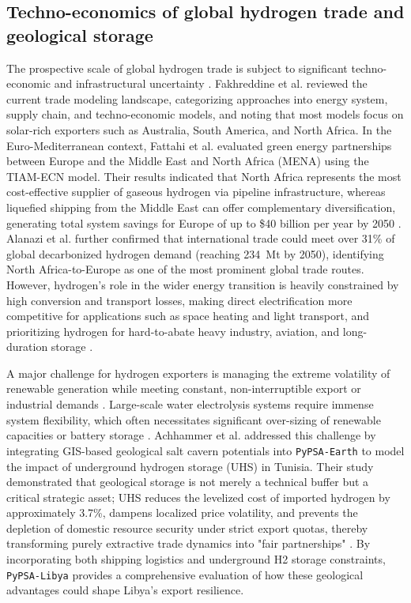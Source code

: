 \documentclass[preprint,12pt]{elsarticle}
\begin{document}
\subsection{Techno-economics of global hydrogen trade and geological storage}
The prospective scale of global hydrogen trade is subject to significant techno-economic and infrastructural uncertainty \cite{fakhreddine2025global}. Fakhreddine et al. \cite{fakhreddine2025global} reviewed the current trade modeling landscape, categorizing approaches into energy system, supply chain, and techno-economic models, and noting that most models focus on solar-rich exporters such as Australia, South America, and North Africa. In the Euro-Mediterranean context, Fattahi et al. \cite{fattahi2024opportunities} evaluated green energy partnerships between Europe and the Middle East and North Africa (MENA) using the TIAM-ECN model. Their results indicated that North Africa represents the most cost-effective supplier of gaseous hydrogen via pipeline infrastructure, whereas liquefied shipping from the Middle East can offer complementary diversification, generating total system savings for Europe of up to \$40 billion per year by 2050 \cite{fattahi2024opportunities}. Alanazi et al. \cite{alanazi2025renewable} further confirmed that international trade could meet over 31\% of global decarbonized hydrogen demand (reaching 234~Mt by 2050), identifying North Africa-to-Europe as one of the most prominent global trade routes. However, hydrogen's role in the wider energy transition is heavily constrained by high conversion and transport losses, making direct electrification more competitive for applications such as space heating and light transport, and prioritizing hydrogen for hard-to-abate heavy industry, aviation, and long-duration storage \cite{johnson2025realistic}.

A major challenge for hydrogen exporters is managing the extreme volatility of renewable generation while meeting constant, non-interruptible export or industrial demands \cite{achhammer2026impact, terlouw2022large}. Large-scale water electrolysis systems require immense system flexibility, which often necessitates significant over-sizing of renewable capacities or battery storage \cite{terlouw2022large}. Achhammer et al. \cite{achhammer2026impact} addressed this challenge by integrating GIS-based geological salt cavern potentials into \texttt{PyPSA-Earth} to model the impact of underground hydrogen storage (UHS) in Tunisia. Their study demonstrated that geological storage is not merely a technical buffer but a critical strategic asset; UHS reduces the levelized cost of imported hydrogen by approximately 3.7\%, dampens localized price volatility, and prevents the depletion of domestic resource security under strict export quotas, thereby transforming purely extractive trade dynamics into "fair partnerships" \cite{achhammer2026impact}. By incorporating both shipping logistics and underground H2 storage constraints, \texttt{PyPSA-Libya} provides a comprehensive evaluation of how these geological advantages could shape Libya's export resilience.
\end{document}
